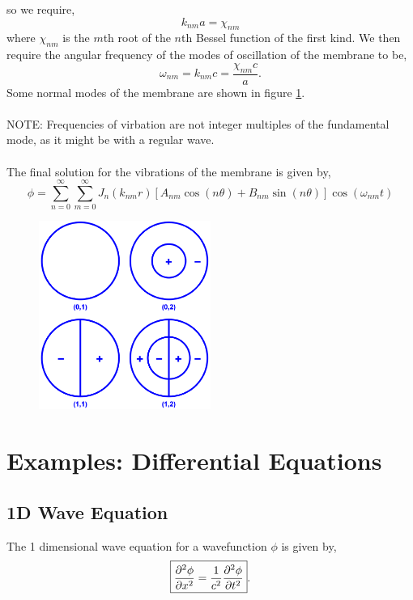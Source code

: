 \documentclass{book}
\begin{document}
so we require,
\begin{equation}
	k_{nm}a = \chi_{nm}
\end{equation}
where $\chi_{nm}$ is the $m$th root of the $n$th Bessel function of the first kind. We then require the angular frequency of the modes of oscillation of the membrane to be,
\begin{equation}
	\omega_{nm} = k_{nm}c = \frac{\chi_{nm}c}{a}.
\end{equation}
Some normal modes of the membrane are shown in figure \ref{fig:normal modes memb}.
\\\\
NOTE: Frequencies of virbation are not integer multiples of the fundamental mode, as it might be with a regular wave.
\\\\
The final solution for the vibrations of the membrane is given by,
\begin{equation}
	\phi = \sum_{n=0}^{\infty}\sum_{m=0}^{\infty}J_n(k_{nm}r)\left[A_{nm}\cos(n\theta) + B_{nm}\sin(n\theta)\right]\cos(\omega_{nm}t)
\end{equation}
\begin{figure}
	\centering
	\includegraphics[width=0.5\textwidth]{normal modes.pdf}
	\caption{}
	\label{fig:normal modes memb}
\end{figure}

\appendix
\chapter{Examples: Differential Equations}
\section{1D Wave Equation}
The 1 dimensional wave equation for a wavefunction $\phi$ is given by,
\begin{equation}
	\boxed{\pdv[2]{\phi}{x} = \frac{1}{c^2}\pdv[2]{\phi}{t}}. \label{eq:1dwave}
\end{equation}
\end{document}
